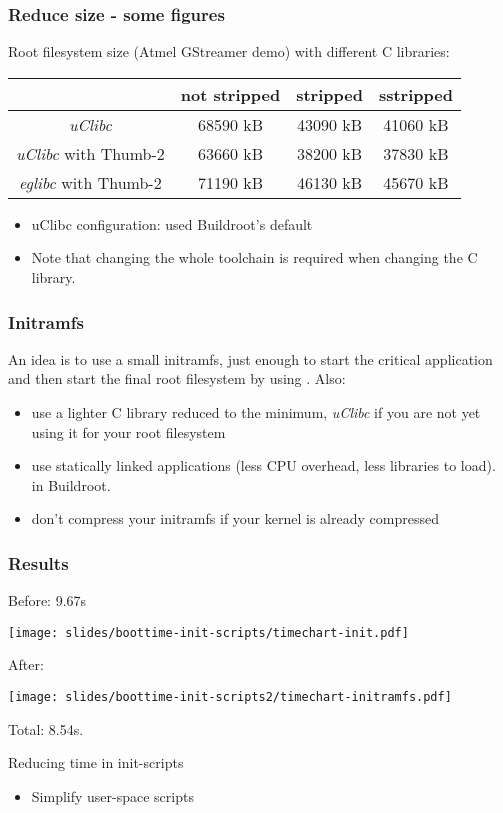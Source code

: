 \begin{frame}
\frametitle{Reduce size - some figures}
Root filesystem size (Atmel GStreamer demo) with different C libraries:
\vfill{}
\begin{tabular}{| c || c | c | c |} \hline
& not stripped & stripped & sstripped \\ \hline
{\em uClibc} & 68590 kB & 43090 kB & 41060 kB \\
{\em uClibc} with Thumb-2 & 63660 kB & 38200 kB & 37830 kB \\
{\em eglibc} with Thumb-2 & 71190 kB & 46130 kB & 45670 kB \\ \hline
\end{tabular}
\vfill{}
\begin{itemize}
\item uClibc configuration: used Buildroot's default
\item Note that changing the whole toolchain is required when changing
      the C library.
\end{itemize}
\end{frame}

\begin{frame}
\frametitle{Initramfs}
An idea is to use a small initramfs, just enough to start the critical
application and then start the final root filesystem by using
. Also:
\begin{itemize}
	\item use a lighter C library reduced to the minimum,
		{\em uClibc} if you are not yet using it for your root filesystem
	\item use statically linked applications (less CPU overhead, less
		libraries to load).  in Buildroot.
	\item don't compress your initramfs if your kernel is already
		compressed
\end{itemize}
\end{frame}

\begin{frame}
\frametitle{Results}
Before: 9.67s
\begin{center}
    \texttt{[image: slides/boottime-init-scripts/timechart-init.pdf]}
\end{center}
After:
\begin{center}
    \texttt{[image: slides/boottime-init-scripts2/timechart-initramfs.pdf]}
\end{center}
Total: 8.54s.
\end{frame}

\setuplabframe
{Reducing time in init-scripts}
{
\begin{itemize}
\item Simplify user-space scripts
\end{itemize}
}
